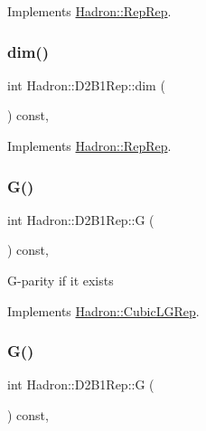 Implements \mbox{\hyperlink{structHadron_1_1RepRep_a92c8802e5ed7afd7da43ccfd5b7cd92b}{Hadron\+::\+Rep\+Rep}}.

\mbox{\label{structHadron_1_1D2B1Rep_a73998a327da6c56b3478b3e356d512d8}} 
\subsubsection{\texorpdfstring{dim()}{dim()}\hspace{0.1cm}{\footnotesize\ttfamily [3/3]}}
{\footnotesize\ttfamily int Hadron\+::\+D2\+B1\+Rep\+::dim (\begin{DoxyParamCaption}{ }\end{DoxyParamCaption}) const\hspace{0.3cm}{\ttfamily [inline]}, {\ttfamily [virtual]}}



Implements \mbox{\hyperlink{structHadron_1_1RepRep_a92c8802e5ed7afd7da43ccfd5b7cd92b}{Hadron\+::\+Rep\+Rep}}.

\mbox{\label{structHadron_1_1D2B1Rep_a23dd0673cd10907133263cfa9a566243}} 
\subsubsection{\texorpdfstring{G()}{G()}\hspace{0.1cm}{\footnotesize\ttfamily [1/2]}}
{\footnotesize\ttfamily int Hadron\+::\+D2\+B1\+Rep\+::G (\begin{DoxyParamCaption}{ }\end{DoxyParamCaption}) const\hspace{0.3cm}{\ttfamily [inline]}, {\ttfamily [virtual]}}

G-\/parity if it exists 

Implements \mbox{\hyperlink{structHadron_1_1CubicLGRep_ace26f7b2d55e3a668a14cb9026da5231}{Hadron\+::\+Cubic\+L\+G\+Rep}}.

\mbox{\label{structHadron_1_1D2B1Rep_a23dd0673cd10907133263cfa9a566243}} 
\subsubsection{\texorpdfstring{G()}{G()}\hspace{0.1cm}{\footnotesize\ttfamily [2/2]}}
{\footnotesize\ttfamily int Hadron\+::\+D2\+B1\+Rep\+::G (\begin{DoxyParamCaption}{ }\end{DoxyParamCaption}) const\hspace{0.3cm}{\ttfamily [inline]}, {\ttfamily [virtual]}}


